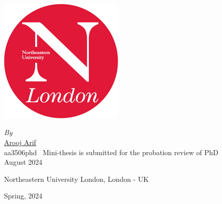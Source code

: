 
\begin{center}

\LARGE {}

\end{center}

\begin{center}
	\includegraphics[width=6cm]{nu_logo.jpeg}
\end{center}
\begin{center}
\emph{\large By}\\

\Large {\href{https://scholar.google.com/citations?hl=en&user=ZEwBUxwAAAAJ&view_op=list_works&authuser=1&gmla=AILGF5XqzU9IqXxSuitd8SwCxQWSLHy9OoSQ59cgiyOt3Pi35gv5n8bJg_gLqFhg9SZZv2U2fvQ7DMDOmR6oiGnT5TQkhZ-vwzUvrJNRPEY2m2XMukSMolIK07cvFv6HJGZ6fEN2UhAmB9NIRd1pNy95LBWH7vzvwukF9plB9Ag}{\color{blue} Arooj Arif}}\\
\Large aa3506phd\
\vfill
\Large Mini-thesis is submitted for the probation review of PhD\\
\Large August 2024\\
\end{center}
\vfill

\begin{center}
\Large Northeastern University London, London - UK
\end{center}

\begin{center}
\LARGE Spring, 2024
\end{center} 
\thispagestyle{empty}